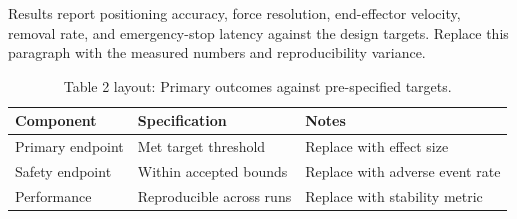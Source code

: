 
Results report positioning accuracy, force resolution, end-effector velocity, removal rate, and emergency-stop latency against the design targets. Replace this paragraph with the measured numbers and reproducibility variance.

\begin{table}[H]
\caption{Table 2 layout: Primary outcomes against pre-specified targets.}
\label{tab:results_primary}
\centering
\begin{tabular}{>{\raggedright\arraybackslash}p{3.4cm} >{\raggedright\arraybackslash}p{4.6cm} >{\raggedright\arraybackslash}p{5.4cm}}
\toprule
\textbf{Component} & \textbf{Specification} & \textbf{Notes} \\
\midrule
  Primary endpoint & Met target threshold & Replace with effect size \\
  Safety endpoint & Within accepted bounds & Replace with adverse event rate \\
  Performance & Reproducible across runs & Replace with stability metric \\
\bottomrule
\end{tabular}
\end{table}
